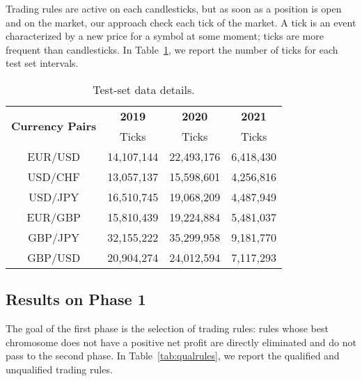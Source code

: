 Trading rules are active on each candlesticks, but as soon as a position is open and on the market, our approach check each tick of the market. A tick is an event characterized by a new price for a symbol at some moment; ticks are more frequent than candlesticks. In Table~\ref{tab:ticks}, we report the number of ticks for each test set intervals.

 \begin{table}[h!]
    \caption{Test-set data details.}
  \begin{center} 
    \label{tab:ticks}
    \begin{tabular}{c c c c }
    \hline
    \multirow{2}{*}{\centering \textbf{Currency Pairs}} &  \textbf{2019}  &  \textbf{2020}&  \textbf{2021}\\\cline{2-4} %
         & Ticks  & Ticks  & Ticks\\ %
      \hline
        EUR/USD   & 14,107,144   & 22,493,176  & 6,418,430\\
        USD/CHF     & 13,057,137   & 15,598,601  & 4,256,816\\
        USD/JPY    & 16,510,745  & 19,068,209   & 4,487,949\\
        EUR/GBP    &  15,810,439 & 19,224,884  & 5,481,037\\
        GBP/JPY   &  32,155,222 & 35,299,958  & 9,181,770\\
        GBP/USD    & 20,904,274  & 24,012,594  & 7,117,293\\
	\hline
    \end{tabular}
  \end{center}
\end{table}

\subsection{Results on Phase 1}
The goal of the first phase is the selection of trading rules: rules whose best chromosome does not have a positive net profit are directly eliminated and do not pass to the second phase.
In Table~\ref{tab:qualrules}, we report the qualified and unqualified trading rules.


